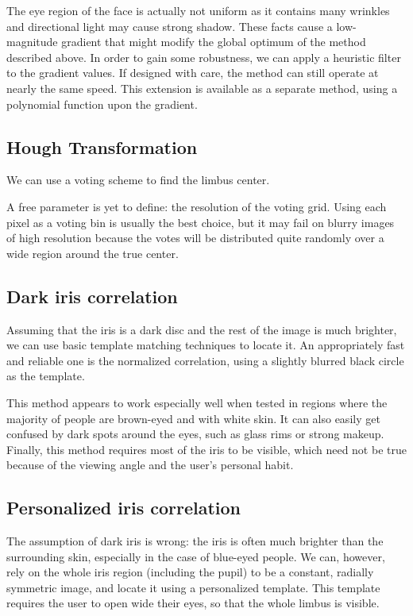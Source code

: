 The eye region of the face is actually not uniform as it contains many wrinkles and directional light may cause strong shadow.
These facts cause a low-magnitude gradient that might modify the global optimum of the method described above.
In order to gain some robustness, we can apply a heuristic filter to the gradient values.
If designed with care, the method can still operate at nearly the same speed.
This extension is available as a separate method, using a polynomial function upon the gradient.

\subsection{Hough Transformation}
We can use a voting scheme to find the limbus center.

A free parameter is yet to define: the resolution of the voting grid.
Using each pixel as a voting bin is usually the best choice, but it may fail on blurry images of high resolution because the votes will be distributed quite randomly over a wide region around the true center.


\subsection{Dark iris correlation}
Assuming that the iris is a dark disc and the rest of the image is much brighter, we can use basic template matching techniques to locate it.
An appropriately fast and reliable one is the normalized correlation, using a slightly blurred black circle as the template.

This method appears to work especially well when tested in regions where the majority of people are brown-eyed and with white skin.
It can also easily get confused by dark spots around the eyes, such as glass rims or strong makeup.
Finally, this method requires most of the iris to be visible, which need not be true because of the viewing angle and the user's personal habit.

\subsection{Personalized iris correlation}
The assumption of dark iris is wrong: the iris is often much brighter than the surrounding skin, especially in the case of blue-eyed people.
We can, however, rely on the whole iris region (including the pupil) to be a constant, radially symmetric image, and locate it using a personalized template.
This template requires the user to open wide their eyes, so that the whole limbus is visible.


